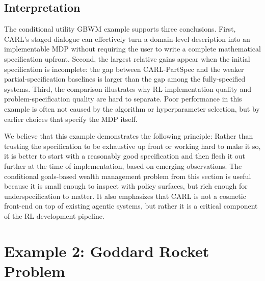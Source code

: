 \documentclass[mnsc,sglanonrev]{informs4}
\begin{document}
\subsection{Interpretation}
\label{sec:gbwm-interpretation}

The conditional utility GBWM example supports three conclusions. First, CARL's staged dialogue can effectively turn a domain-level description into an implementable MDP without requiring the user to write a complete mathematical specification upfront. Second, the largest relative gains appear when the initial specification is incomplete: the gap between CARL-PartSpec and the weaker partial-specification baselines is larger than the gap among the fully-specified systems. Third, the comparison illustrates why RL implementation quality and problem-specification quality are hard to separate. Poor performance
in this example is often not caused by the algorithm or hyperparameter selection, but by earlier choices that specify the MDP itself.

We believe that this example demonstrates the following principle: Rather than trusting the specification to be exhaustive up front or working hard to make it so, it is better to start with a reasonably good specification and then flesh it out further at the time of implementation, based on emerging observations. The conditional goals-based wealth management problem from this section is useful because it is small enough to inspect with policy surfaces, but rich enough for underspecification to matter. It also emphasizes that CARL is not a cosmetic front-end on top of existing agentic systems, but rather it is a critical component of the RL development pipeline.



\section{Example 2: Goddard Rocket Problem}
\label{sec:example_goddard}
\end{document}
